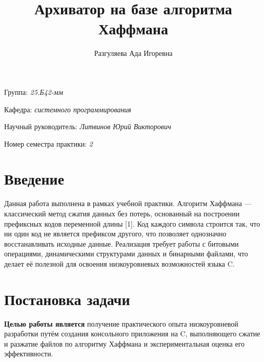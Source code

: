 \documentclass[a4paper]{article}
\title{Архиватор на базе алгоритма Хаффмана}
\author{Разгуляева Ада Игоревна}
\date{}
\begin{document}
\maketitle

\begin{flushright}
    Группа: \emph{25.Б42-мм}

    Кафедра: \emph{системного программирования}

    Научный руководитель: \emph{Литвинов Юрий Викторович}

    
    Номер семестра практики: \emph{2}
\end{flushright} 

\section{Введение}

Данная работа выполнена в рамках учебной практики. Алгоритм Хаффмана — классический метод сжатия данных без потерь, основанный на построении префиксных кодов переменной длины [1]. Код каждого символа строится так, что ни один код не является префиксом другого, что позволяет однозначно восстанавливать исходные данные. Реализация требует работы с битовыми операциями, динамическими структурами данных и бинарными файлами, что делает её полезной для освоения низкоуровневых возможностей языка C.


\section{Постановка задачи}

\textbf{Целью работы является} получение практического опыта низкоуровневой 
разработки путём создания консольного приложения на C, выполняющего сжатие и разжатие
файлов по алгоритму Хаффмана и экспериментальная оценка его эффективности.
\end{document}
